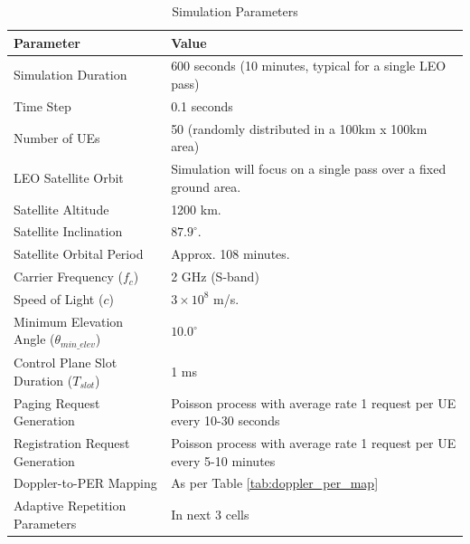 \documentclass[conference]{IEEEtran}
\begin{document}
\begin{table}[h!]
    \centering
    \caption{Simulation Parameters}
    \label{Simulation_Parameters}

\begin{tabular}{|>{\centering\arraybackslash}m{3cm}|m{4.5cm}|}
        \hline
        \textbf{Parameter} & \textbf{Value}  \\
        \hline
        Simulation Duration & 600 seconds (10 minutes, typical for a single LEO pass) \\
        \hline
        Time Step & 0.1 seconds  \\
        \hline
        Number of UEs & 50 (randomly distributed in a 100km x 100km area) \\
        \hline
        LEO Satellite Orbit&Simulation will focus on a single pass over a fixed ground area.\\
        \hline

        Satellite Altitude & 1200 km.\\
        \hline
         Satellite Inclination & $87.9^\circ$.\\
        \hline
        Satellite Orbital Period & Approx. 108 minutes.\\


        \hline

        Carrier Frequency ($f_c$) & 2 GHz (S-band)  \\
        \hline

        Speed of Light ($c$) & $3 \times 10^8$ m/s.  \\
        \hline

        Minimum Elevation Angle ($\theta_{min\_elev}$) & $10.0^\circ$ \\
        \hline

        Control Plane Slot Duration ($T_{slot}$) & 1 ms  \\
        \hline

        Paging Request Generation & Poisson process with average rate 1 request per UE every 10-30 seconds  \\
        \hline

        Registration Request Generation & Poisson process with average rate  1 request per UE every 5-10 minutes  \\
        \hline

        Doppler-to-PER Mapping & As per Table \ref{tab:doppler_per_map}  \\
        \hline

        Adaptive Repetition Parameters & In next 3 cells  \\
        \hline


\end{tabular}
\end{table}
\end{document}
